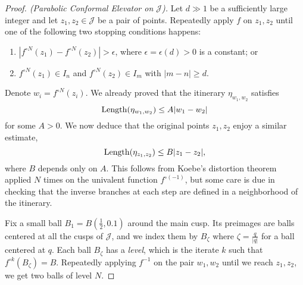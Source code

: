 \begin{proof}[Proof. (Parabolic Conformal Elevator on $\mathcal J$)] \label{parabolic-elevator}
Let $d\gg 1$ be a sufficiently large integer and let $z_1,z_2 \in \mathcal J$ be a pair of points. Repeatedly apply $f$ on $z_1,z_2$ until one of the following two stopping conditions happens:
\begin{enumerate}[label=\normalfont(\roman*)]
	\item $\left|f^{\circ N}(z_1)-f^{\circ N}(z_2)\right|>\epsilon$, where $\epsilon=\epsilon(d)>0$ is a constant;		
	or
	\item $f^{\circ N }(z_1) \in I_n$ and $f^{\circ N }(z_2) \in I_m$ with $|m-n| \geq d$.		
\end{enumerate}

Denote $w_i=f^{\circ N}(z_i)$. We already proved that the itinerary $\eta_{w_1,w_2}$ satisfies
\begin{equation*}
	\operatorname{Length}(\eta_{w_1,w_2}) \leq A |w_1-w_2|
\end{equation*}
for some $A>0$. We now deduce that the original points $z_1,z_2$ enjoy a similar estimate,
\begin{equation*}
	\operatorname{Length}(\eta_{z_1,z_2}) \leq B |z_1-z_2|,
\end{equation*}
where $B$ depends only on $A$. This follows from Koebe's distortion theorem applied $N$ times on the univalent function $f^{\circ(-1)}$, but some care is due in checking that the inverse branches at each step are defined in a neighborhood of the itinerary.

Fix a small ball $B_1=B(\frac 12, 0.1)$ around the main cusp. Its preimages are balls centered at all the cusps of $\mathcal J$, and we index them by $B_\zeta$ where $\zeta=\frac q{|q|}$ for a ball centered at $q$. Each ball $B_{\zeta}$ has a \emph{level}, which is the iterate $k$ such that $f^{\circ k}(B_{\zeta}) = B$. Repeatedly applying $f^{-1}$ on the pair $w_1,w_2$ until we reach $z_1,z_2$, we get two balls of level $N$.



\end{proof}
